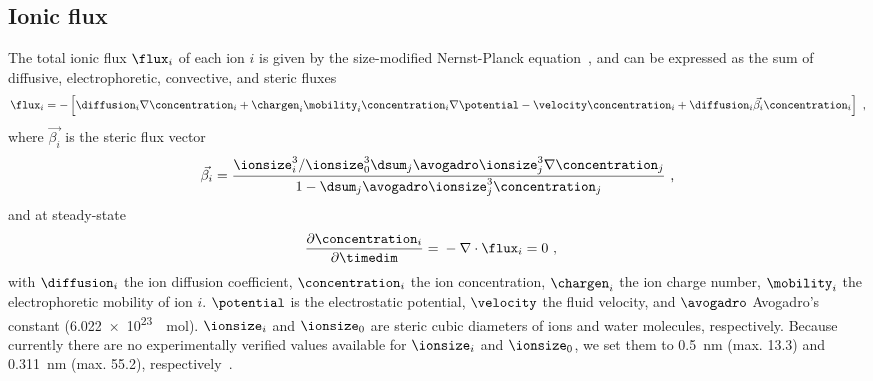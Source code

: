 \subsection{Ionic flux}
%

The total ionic flux $\flux_{i}$ of each ion $i$ is given by the size-modified Nernst-Planck
equation~\cite{Lu-2011}, and can be expressed as the sum of diffusive, electrophoretic, convective, and steric
fluxes
%
\begin{align}
  \label{eq:sm-nernst-planck}
  \flux_{i} = -\left[
    \diffusion_{i} \nabla \concentration_{i}
    + \chargen_{i} \mobility_{i} \concentration_{i} \nabla \potential
    - \velocity \concentration_{i}
    + \diffusion_{i} \vec{\beta_{i}} \concentration_{i} \right]
  \text{ ,}
\end{align}
%
where $\vec{\beta_{i}}$ is the steric flux vector
%
\begin{align}\label{eq:epnp-ns_steric_flux_vector}
  \vec{\beta_{i}} =
      \frac{ \ionsize_{i}^3 / \ionsize_{0}^3 \dsum_{j} \avogadro \ionsize_{j}^3 \nabla \concentration_{j} }
          { 1 - \dsum_{j} \avogadro \ionsize_{j}^3 \concentration_{j} }
  \text{ ,}
\end{align}
%
and at steady-state
%
\begin{align}
  \dfrac{\partial \concentration_{i}}{\partial \timedim} ={}& - \nabla \cdot \flux_{i} = 0
  \text{ ,}
\end{align}
%
with $\diffusion_{i}$ the ion diffusion coefficient, $\concentration_{i}$ the ion concentration,
$\chargen_{i}$ the ion charge number, $\mobility_{i}$ the electrophoretic mobility of ion $i$. $\potential$ is
the electrostatic potential, $\velocity$ the fluid velocity, and $\avogadro$ Avogadro's constant
(\SI{6.022e23}{\per\mole}). $\ionsize_{i}$ and $\ionsize_{0}$ are steric cubic diameters of ions
and water molecules, respectively. Because currently there are no experimentally verified values available for
$\ionsize_{i}$ and $\ionsize_{0}$, we set them to \SI{0.5}{\nm} (max. \SI{13.3}{\Molar}) and \SI{0.311}{\nm}
(max. \SI{55.2}{\Molar}), respectively~\cite{Bazant-2009}.

